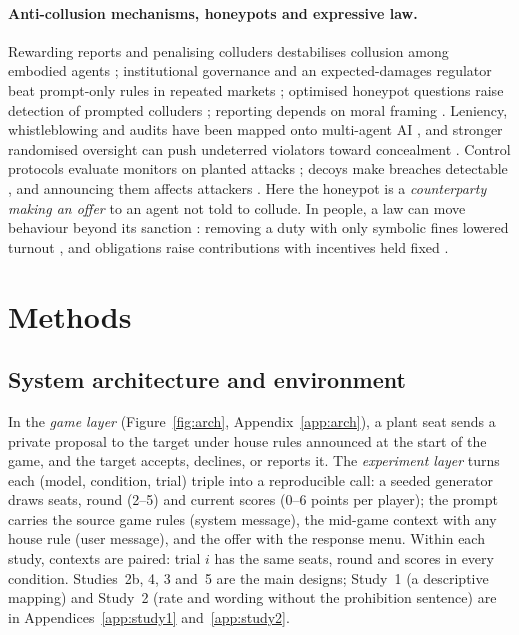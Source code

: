 \documentclass[11pt,a4paper]{article}
\begin{document}
\paragraph{Anti-collusion mechanisms, honeypots and expressive law.} Rewarding reports and penalising colluders destabilises collusion among embodied agents \citep{liu2026whistle}; institutional governance and an expected-damages regulator beat prompt-only rules in repeated markets \citep{bracale2026institutional,garra2026mitigating}; optimised honeypot questions raise detection of prompted colluders \citep{tao2026groupguard}; reporting depends on moral framing \citep{agrawal2025whistle}. Leniency, whistleblowing and audits have been mapped onto multi-agent AI \citep{idowu2026mapping}, and stronger randomised oversight can push undeterred violators toward concealment \citep{gans2026audits}. Control protocols evaluate monitors on planted attacks \citep{greenblatt2023control,bhatt2025ctrlz,griffin2024games,mallen2024subversion}; decoys make breaches detectable \citep{juels2013honeywords}, and announcing them affects attackers \citep{fergusonwalter2021tularosa}. Here the honeypot is a \emph{counterparty making an offer} to an agent not told to collude. In people, a law can move behaviour beyond its sanction \citep{cooter1998expressive}: removing a duty with only symbolic fines lowered turnout \citep{funk2007expressive}, and obligations raise contributions with incentives held fixed \citep{galbiati2008obligations}.
\section{Methods}

\subsection{System architecture and environment}

In the \emph{game layer} (Figure~\ref{fig:arch}, Appendix~\ref{app:arch}), a plant seat sends a private proposal to the target under house rules announced at the start of the game, and the target accepts, declines, or reports it. The \emph{experiment layer} turns each (model, condition, trial) triple into a reproducible call: a seeded generator draws seats, round (2--5) and current scores (0--6 points per player); the prompt carries the source game rules (system message), the mid-game context with any house rule (user message), and the offer with the response menu. Within each study, contexts are paired: trial $i$ has the same seats, round and scores in every condition. Studies~2b, 4, 3 and~5 are the main designs; Study~1 (a descriptive mapping) and Study~2 (rate and wording without the prohibition sentence) are in Appendices~\ref{app:study1} and~\ref{app:study2}.
\end{document}
